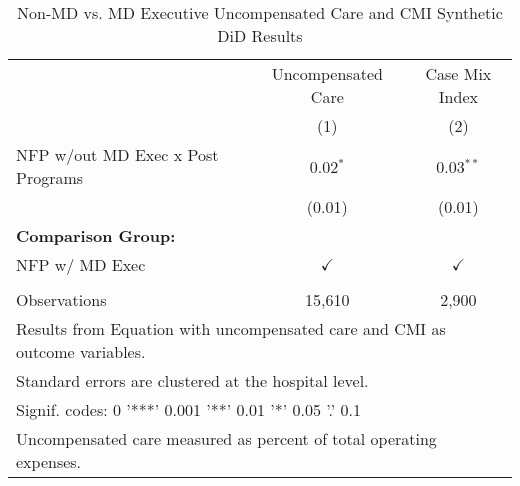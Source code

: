 \begin{table}[ht!]

\caption{\label{tab:MD_noMD_uncompCMI_synth}Non-MD vs. MD Executive Uncompensated Care and CMI Synthetic DiD Results}
\centering
\begin{tabular}[t]{lcc}
\toprule
\multicolumn{1}{c}{ } & \multicolumn{1}{c}{Uncompensated Care} & \multicolumn{1}{c}{Case Mix Index} \\
 & (1) & (2)\\
\midrule
NFP w/out MD Exec x Post Programs & 0.02$^{*}$ & 0.03$^{**}$\\
 & (0.01) & (0.01)\\
\textbf{Comparison Group:} &  & \\
NFP w/ MD Exec & $\checkmark$ & $\checkmark$\\
 &  & \\
\addlinespace
Observations & 15,610 & 2,900\\
\bottomrule
\multicolumn{3}{l}{\textsuperscript{} Results from Equation with uncompensated care and CMI as outcome variables.}\\
\multicolumn{3}{l}{\textsuperscript{} Standard errors are clustered at the hospital level.}\\
\multicolumn{3}{l}{\textsuperscript{} Signif. codes: 0 '***' 0.001 '**' 0.01 '*' 0.05 '.' 0.1}\\
\multicolumn{3}{l}{\textsuperscript{} Uncompensated care measured as percent of total operating expenses.}\\
\end{tabular}
\end{table}
